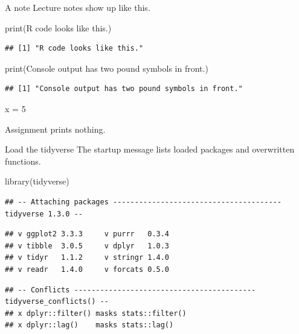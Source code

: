 \documentclass[
  ignorenonframetext,
]{beamer}
\newenvironment{Shaded}{\begin{snugshade}}{\end{snugshade}}
\newcommand{\DecValTok}[1]{\textcolor[rgb]{0.00,0.00,0.81}{#1}}
\newcommand{\FunctionTok}[1]{\textcolor[rgb]{0.00,0.00,0.00}{#1}}
\newcommand{\NormalTok}[1]{#1}
\newcommand{\OtherTok}[1]{\textcolor[rgb]{0.56,0.35,0.01}{#1}}
\newcommand{\StringTok}[1]{\textcolor[rgb]{0.31,0.60,0.02}{#1}}
\begin{document}
\begin{frame}[fragile]{A note}
\protect\hypertarget{a-note}{}
Lecture notes show up like this.

\begin{Shaded}
\begin{Highlighting}[]
\FunctionTok{print}\NormalTok{(}\StringTok{\textquotesingle{}R code looks like this.\textquotesingle{}}\NormalTok{)}
\end{Highlighting}
\end{Shaded}

\begin{verbatim}
## [1] "R code looks like this."
\end{verbatim}

\begin{Shaded}
\begin{Highlighting}[]
\FunctionTok{print}\NormalTok{(}\StringTok{\textquotesingle{}Console output has two pound symbols in front.\textquotesingle{}}\NormalTok{)}
\end{Highlighting}
\end{Shaded}

\begin{verbatim}
## [1] "Console output has two pound symbols in front."
\end{verbatim}

\begin{Shaded}
\begin{Highlighting}[]
\NormalTok{x }\OtherTok{=} \DecValTok{5} 
\end{Highlighting}
\end{Shaded}

Assignment prints nothing.
\end{frame}

\begin{frame}[fragile]{Load the tidyverse}
\protect\hypertarget{load-the-tidyverse}{}
The startup message lists loaded packages and overwritten functions.

\begin{Shaded}
\begin{Highlighting}[]
\FunctionTok{library}\NormalTok{(tidyverse)}
\end{Highlighting}
\end{Shaded}

\begin{verbatim}
## -- Attaching packages --------------------------------------- tidyverse 1.3.0 --
\end{verbatim}

\begin{verbatim}
## v ggplot2 3.3.3     v purrr   0.3.4
## v tibble  3.0.5     v dplyr   1.0.3
## v tidyr   1.1.2     v stringr 1.4.0
## v readr   1.4.0     v forcats 0.5.0
\end{verbatim}

\begin{verbatim}
## -- Conflicts ------------------------------------------ tidyverse_conflicts() --
## x dplyr::filter() masks stats::filter()
## x dplyr::lag()    masks stats::lag()
\end{verbatim}
\end{frame}
\end{document}
